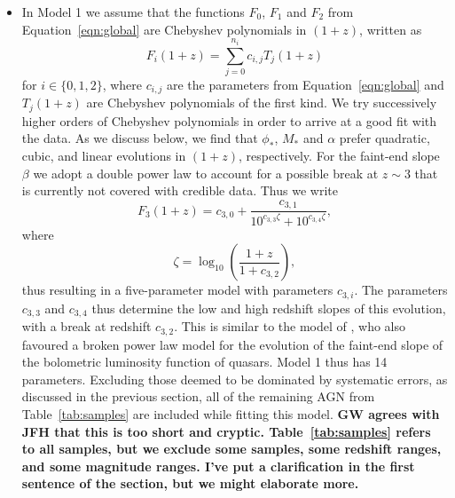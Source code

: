 \documentclass[fleqn,usenatbib]{mnras}
\begin{document}
\begin{itemize}

\item
  In Model 1 we assume that the functions $F_0$, $F_1$ and $F_2$ from
  Equation~\eqref{eqn:global} are Chebyshev polynomials in
  $\left(1+z\right)$, written as
  \begin{equation}
    F_i\left(1+z\right)=\sum_{j=0}^{n_i}c_{i,j}T_j\left(1+z\right)
    \label{eqn:cbs}
  \end{equation}
  for $i\in\{0,1,2\}$, where $c_{i,j}$ are the parameters from
  Equation~\eqref{eqn:global} and $T_j\left(1+z\right)$ are Chebyshev
  polynomials of the first kind. We try successively higher orders of
  Chebyshev polynomials in order to arrive at a good fit with the
  data.  As we discuss below, we find that $\phi_*$, $M_*$ and
  $\alpha$ prefer quadratic, cubic, and linear evolutions in
  $\left(1+z\right)$, respectively.  For the faint-end slope $\beta$
  we adopt a double power law to account for a possible break at
  $z\sim 3$ that is currently not covered with credible data.  Thus we
  write
  \begin{equation}
    F_3\left(1+z\right)=c_{3,0}+\frac{c_{3,1}}{10^{c_{3,3}\zeta}+10^{c_{3,4}\zeta}},
    \label{eqn:beta}
  \end{equation}
  where
  \begin{equation}
    \zeta = \log_{10}\left(\frac{1+z}{1+c_{3,2}}\right),
  \end{equation}
  thus resulting in a five-parameter model with parameters $c_{3,i}$.
  The parameters $c_{3,3}$ and $c_{3,4}$ thus determine the low and
  high redshift slopes of this evolution, with a break at redshift
  $c_{3,2}$.  This is similar to the model of
  \citet{2007ApJ...654..731H}, who also favoured a broken power law
  model for the evolution of the faint-end slope of the bolometric
  luminosity function of quasars.  Model 1 thus has 14 parameters.
  Excluding those deemed to be dominated by systematic errors, as
  discussed in the previous section, all of the remaining AGN from
  Table~\ref{tab:samples} are included while fitting this model.
  \textbf{GW agrees with JFH that this is too short and
    cryptic. Table~\ref{tab:samples} refers to all samples, but we
    exclude some samples, some redshift ranges, and some magnitude
    ranges. I've put a clarification in the first sentence of the
    section, but we might elaborate more.}


\end{itemize}
\end{document}
